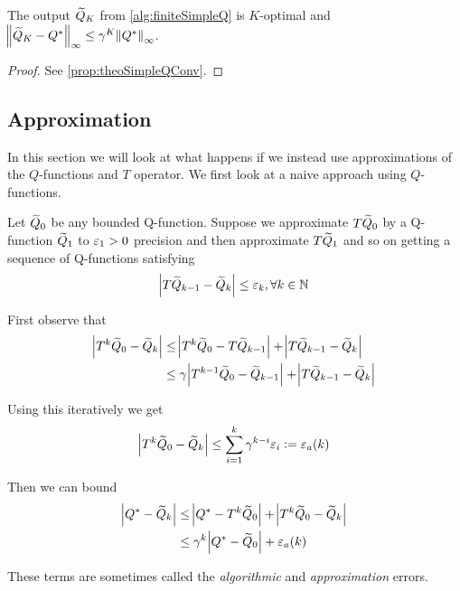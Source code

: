 \begin{prop}
  The output $\widetilde{Q}_K$ from \cref{alg:finiteSimpleQ} is
  $K$-optimal and
  $\norm{\widetilde{Q}_K - Q^*}_\infty \leq \gamma^K \norm{Q^*}_\infty$.
\end{prop}
\begin{proof}
  See \cref{prop:theoSimpleQConv}.
\end{proof}



\subsection{Approximation}

In this section we will look at what happens if we
instead use approximations of the $Q$-functions and $T$ operator.
We first look at a naive approach using $Q$-functions.

Let $\widetilde{Q}_0$ be any bounded Q-function.
Suppose we approximate $T\widetilde{Q}_0$ by a Q-function $\widetilde{Q}_1$
to $\varepsilon_1 > 0$ precision and then approximate $T\widetilde{Q}_1$ and so on
getting a sequence of Q-functions satisfying
\[ \abs{T\widetilde{Q}_{k-1} - \widetilde{Q}_k} \leq \varepsilon_k, \forall k \in \mathbb{N} \]

First observe that
\begin{align*}
  \abs{T^k \widetilde{Q}_0 - \widetilde{Q}_k}
  &\leq \abs{T^k \widetilde{Q}_0 - T \widetilde{Q}_{k-1}} + \abs{T\widetilde{Q}_{k-1} - \widetilde{Q}_k}
  \\ &\leq \gamma \abs{T^{k-1} \widetilde{Q}_0 - \widetilde{Q}_{k-1}}
  + \abs{T\widetilde{Q}_{k-1} - \widetilde{Q}_k}
\end{align*}

Using this iteratively we get
\[ \abs{T^k \widetilde{Q}_0 - \widetilde{Q}_k} \leq \sum_{i=1}^k \gamma^{k-i} \varepsilon_i
\vcentcolon= \varepsilon_a(k) \]

Then we can bound
\begin{align*}
  \abs{Q^* - \widetilde{Q}_k}
  &\leq \abs{Q^* - T^k \widetilde{Q}_0} + \abs{T^k \widetilde{Q}_0 - \widetilde{Q}_k}
  \\ &\leq \gamma^k \abs{Q^* - \widetilde{Q}_0}
  + \varepsilon_a(k)
\end{align*}

These terms are sometimes called the \emph{algorithmic}
and \emph{approximation} errors.


